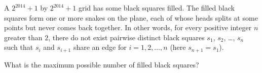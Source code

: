 A $2^{2014} + 1$ by $2^{2014} + 1$ grid has some black squares filled. The filled black squares form one or more snakes on the plane, each of whose heads splits at some points but never comes back together. In other words, for every positive integer $n$ greater than $2$, there do not exist pairwise distinct black squares $s_1$, $s_2$, \dots, $s_n$ such that $s_i$ and $s_{i+1}$ share an edge for $i=1,2, \dots, n$ (here $s_{n+1}=s_1$).

What is the maximum possible number of filled black squares?